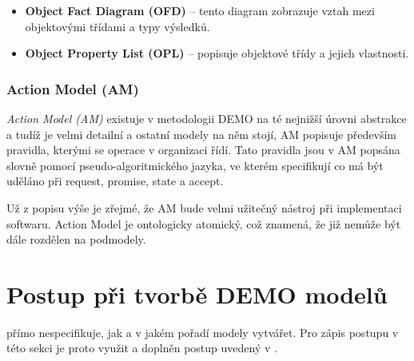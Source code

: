 \begin{itemize}
\item \textbf{Object Fact Diagram (OFD)} – tento diagram zobrazuje vztah mezi objektovými třídami a typy výsledků.
\item \textbf{Object Property List (OPL)} – popisuje objektové třídy a jejich vlastnosti.
\end{itemize}

\subsubsection{Action Model (AM)}
\textit{Action Model (AM)} existuje v metodologii DEMO na té nejnižší úrovni abstrakce a tudíž je velmi detailní a ostatní modely na něm stojí, AM popisuje především pravidla, kterými se operace v organizaci řídí. Tato pravidla jsou v AM popsána slovně pomocí pseudo-algoritmického jazyka, ve kterém specifikují co má být uděláno při request, promise, state a accept.

Už z popisu výše je zřejmé, že AM bude velmi užitečný nástroj při implementaci softwaru. Action Model je ontologicky atomický, což znamená, že již nemůže být dále rozdělen na podmodely.

\section{Postup při tvorbě DEMO modelů}
\cite{Dietz2006} přímo nespecifikuje, jak a v jakém pořadí modely vytvářet. Pro zápis postupu v této sekci je proto využit a doplněn postup uvedený v \cite{Vejrazkova2012}.

